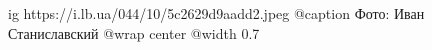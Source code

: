  
 
 
 
 

\ifcmt
  ig https://i.lb.ua/044/10/5c2629d9aadd2.jpeg
	@caption Фото: Иван Станиславский
  @wrap center
  @width 0.7
\fi
